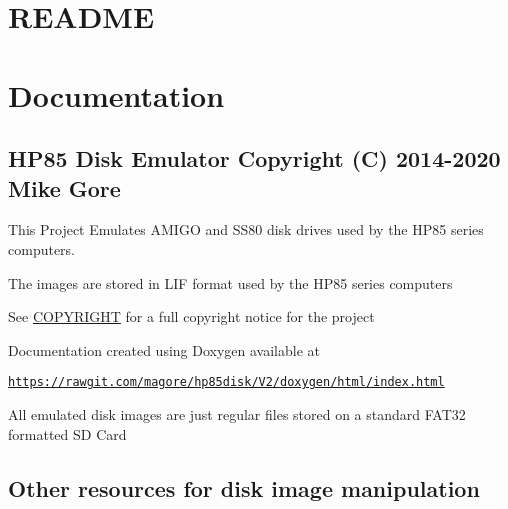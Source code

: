 \hypertarget{md_README_README}{}\section{R\+E\+A\+D\+ME}\label{md_README_README}
\section*{Documentation}

\subsection*{H\+P85 Disk Emulator Copyright (C) 2014-\/2020 Mike Gore}


\begin{DoxyItemize}
\item This Project Emulates A\+M\+I\+GO and S\+S80 disk drives used by the H\+P85 series computers.
\item The images are stored in L\+IF format used by the H\+P85 series computers
\item See \hyperlink{COPYRIGHT_8md}{C\+O\+P\+Y\+R\+I\+G\+HT} for a full copyright notice for the project
\item Documentation created using Doxygen available at
\begin{DoxyItemize}
\item \href{https://rawgit.com/magore/hp85disk/V2/doxygen/html/index.html}{\tt https\+://rawgit.\+com/magore/hp85disk/\+V2/doxygen/html/index.\+html}
\item All emulated disk images are just regular files stored on a standard F\+A\+T32 formatted SD Card
\end{DoxyItemize}
\end{DoxyItemize}

\subsection*{Other resources for disk image manipulation}


